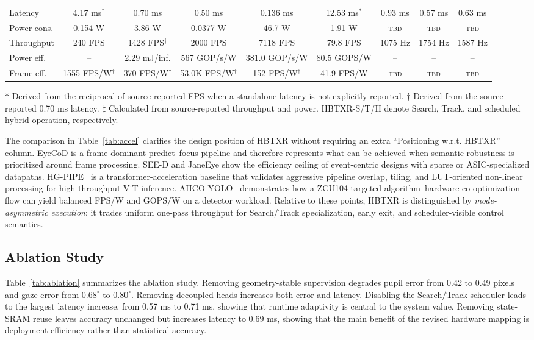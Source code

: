 \documentclass[journal]{IEEEtran}
\newcommand{\TBD}{\textsc{tbd}}
\begin{document}
\begin{table}[t]
{\begin{tabular}{@{}lcccccccc@{}}
Latency & 4.17 ms$^\ast$ & 0.70 ms & 0.50 ms & 0.136 ms & 12.53 ms$^\ast$ & 0.93 ms & 0.57 ms & 0.63 ms \\
Power cons. & 0.154 W & 3.86 W & 0.0377 W & 46.7 W & 1.91 W & \TBD & \TBD & \TBD \\
Throughput & 240 FPS & 1428 FPS$^\dagger$ & 2000 FPS & 7118 FPS & 79.8 FPS & 1075 Hz & 1754 Hz & 1587 Hz \\
Power eff. & -- & 2.29 mJ/inf. & 567 GOP/s/W & 381.0 GOP/s/W & 80.5 GOPS/W & -- & -- & -- \\
Frame eff. & 1555 FPS/W$^\ddagger$ & 370 FPS/W$^\ddagger$ & 53.0K FPS/W$^\ddagger$ & 152 FPS/W$^\ddagger$ & 41.9 FPS/W & \TBD & \TBD & \TBD \\
\bottomrule
\end{tabular}}
\vspace{1mm}
\parbox{\textwidth}{\footnotesize $\ast$ Derived from the reciprocal of source-reported FPS when a standalone latency is not explicitly reported. $\dagger$ Derived from the source-reported 0.70 ms latency. $\ddagger$ Calculated from source-reported throughput and power. HBTXR-S/T/H denote Search, Track, and scheduled hybrid operation, respectively.}
\end{table}

The comparison in Table~\ref{tab:accel} clarifies the design position of HBTXR without requiring an extra ``Positioning w.r.t. HBTXR'' column. EyeCoD is a frame-dominant predict--focus pipeline and therefore represents what can be achieved when semantic robustness is prioritized around frame processing. SEE-D and JaneEye show the efficiency ceiling of event-centric designs with sparse or ASIC-specialized datapaths. HG-PIPE~\cite{ref11} is a transformer-acceleration baseline that validates aggressive pipeline overlap, tiling, and LUT-oriented non-linear processing for high-throughput ViT inference. AHCO-YOLO~\cite{ref12} demonstrates how a ZCU104-targeted algorithm--hardware co-optimization flow can yield balanced FPS/W and GOPS/W on a detector workload. Relative to these points, HBTXR is distinguished by \emph{mode-asymmetric execution}: it trades uniform one-pass throughput for Search/Track specialization, early exit, and scheduler-visible control semantics.

\subsection{Ablation Study}
Table~\ref{tab:ablation} summarizes the ablation study. Removing geometry-stable supervision degrades pupil error from 0.42 to 0.49 pixels and gaze error from $0.68^{\circ}$ to $0.80^{\circ}$. Removing decoupled heads increases both error and latency. Disabling the Search/Track scheduler leads to the largest latency increase, from 0.57 ms to 0.71 ms, showing that runtime adaptivity is central to the system value. Removing state-SRAM reuse leaves accuracy unchanged but increases latency to 0.69 ms, showing that the main benefit of the revised hardware mapping is deployment efficiency rather than statistical accuracy.
\end{document}
